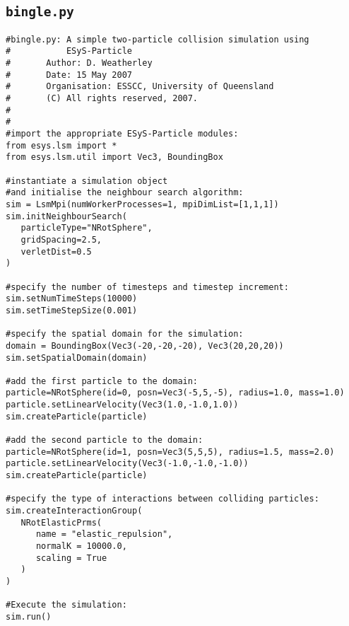 \subsection{\texttt{bingle.py}}\label{code:bingle}

\begin{verbatim}
#bingle.py: A simple two-particle collision simulation using
#           ESyS-Particle
#       Author: D. Weatherley
#       Date: 15 May 2007
#       Organisation: ESSCC, University of Queensland
#       (C) All rights reserved, 2007.
#
#
#import the appropriate ESyS-Particle modules:
from esys.lsm import *
from esys.lsm.util import Vec3, BoundingBox

#instantiate a simulation object
#and initialise the neighbour search algorithm:
sim = LsmMpi(numWorkerProcesses=1, mpiDimList=[1,1,1])
sim.initNeighbourSearch(
   particleType="NRotSphere",
   gridSpacing=2.5,
   verletDist=0.5
)

#specify the number of timesteps and timestep increment:
sim.setNumTimeSteps(10000)
sim.setTimeStepSize(0.001)

#specify the spatial domain for the simulation:
domain = BoundingBox(Vec3(-20,-20,-20), Vec3(20,20,20))
sim.setSpatialDomain(domain)

#add the first particle to the domain:
particle=NRotSphere(id=0, posn=Vec3(-5,5,-5), radius=1.0, mass=1.0)
particle.setLinearVelocity(Vec3(1.0,-1.0,1.0))
sim.createParticle(particle)

#add the second particle to the domain:
particle=NRotSphere(id=1, posn=Vec3(5,5,5), radius=1.5, mass=2.0)
particle.setLinearVelocity(Vec3(-1.0,-1.0,-1.0))
sim.createParticle(particle)

#specify the type of interactions between colliding particles:
sim.createInteractionGroup(
   NRotElasticPrms(
      name = "elastic_repulsion",
      normalK = 10000.0,
      scaling = True
   )
)

#Execute the simulation:
sim.run()
\end{verbatim}
